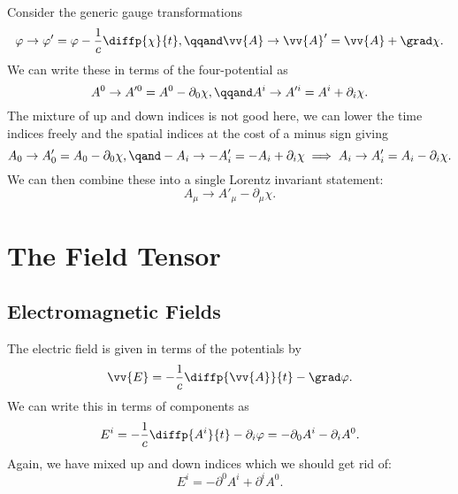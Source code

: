 Consider the generic gauge transformations
\begin{equation}
    \varphi \to \varphi' = \varphi - \frac{1}{c}\diffp{\chi}{t}, \qqand \vv{A} \to \vv{A}' = \vv{A} + \grad\chi.
\end{equation}
We can write these in terms of the four-potential as
\begin{equation}
    A^0 \to A'^0 = A^0 - \partial_0\chi, \qqand A^i \to A'^i = A^i + \partial_i\chi.
\end{equation}
The mixture of up and down indices is not good here, we can lower the time indices freely and the spatial indices at the cost of a minus sign giving
\begin{equation*}
    A_0 \to A'_0 = A_0 - \partial_0\chi, \qand -A_i \to -A'_i = -A_i + \partial_i\chi \implies A_i \to A'_i = A_i - \partial_i\chi.
\end{equation*}
We can then combine these into a single Lorentz invariant statement:
\begin{equation}
    A_\mu \to A'_\mu - \partial_\mu\chi.
\end{equation}

\chapter{The Field Tensor}
\section{Electromagnetic Fields}
The electric field is given in terms of the potentials by
\begin{equation}
    \vv{E} = -\frac{1}{c}\diffp{\vv{A}}{t} - \grad\varphi.
\end{equation}
We can write this in terms of components as
\begin{equation}
    E^i = -\frac{1}{c}\diffp{A^i}{t} - \partial_i\varphi = -\partial_0A^i - \partial_iA^0.
\end{equation}
Again, we have mixed up and down indices which we should get rid of:
\begin{equation}
    E^i = -\partial^0A^i + \partial^iA^0.
\end{equation}

